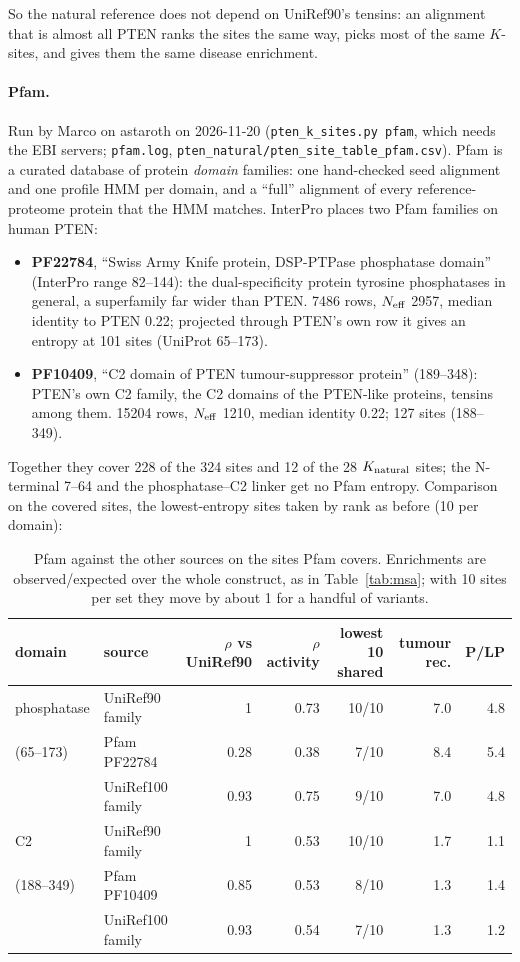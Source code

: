 \documentclass[11pt,a4paper]{article}
\newcommand{\file}[1]{\texttt{#1}}
\begin{document}
So the natural reference does not depend on UniRef90's tensins: an
alignment that is almost all PTEN ranks the sites the same way, picks most of
the same $K$-sites, and gives them the same disease enrichment.

\paragraph{Pfam.} Run by Marco on astaroth on 2026-11-20
(\texttt{pten\_k\_sites.py pfam}, which needs the EBI servers; \file{pfam.log},
\file{pten\_natural/pten\_site\_table\_pfam.csv}). Pfam is a curated database
of protein \emph{domain} families: one hand-checked seed alignment and one
profile HMM per domain, and a ``full'' alignment of every reference-proteome
protein that the HMM matches. InterPro places two Pfam families on human PTEN:
\begin{itemize}
\item \textbf{PF22784}, ``Swiss Army Knife protein, DSP-PTPase phosphatase
  domain'' (InterPro range 82--144): the dual-specificity protein tyrosine
  phosphatases in general, a superfamily far wider than PTEN. 7486 rows,
  $N_{\rm eff}$ 2957, median identity to PTEN 0.22; projected through PTEN's
  own row it gives an entropy at 101 sites (UniProt 65--173).
\item \textbf{PF10409}, ``C2 domain of PTEN tumour-suppressor protein''
  (189--348): PTEN's own C2 family, the C2 domains of the PTEN-like
  proteins, tensins among them. 15204 rows, $N_{\rm eff}$ 1210, median identity 0.22;
  127 sites (188--349).
\end{itemize}
Together they cover 228 of the 324 sites and 12 of the 28 $K_{\rm natural}$
sites; the N-terminal 7--64 and the phosphatase--C2 linker get no Pfam
entropy. Comparison on the covered sites, the lowest-entropy sites taken by
rank as before (10 per domain):

\begin{table}[H]\centering\small
\begin{tabular}{@{}llrrrrr@{}}
\toprule
domain & source & $\rho$ vs UniRef90 & $\rho$ activity & lowest 10 shared & tumour rec. & P/LP\\
\midrule
phosphatase & UniRef90 family & 1 & 0.73 & 10/10 & 7.0 & 4.8\\
(65--173) & Pfam PF22784 & 0.28 & 0.38 & 7/10 & 8.4 & 5.4\\
 & UniRef100 family & 0.93 & 0.75 & 9/10 & 7.0 & 4.8\\
\midrule
C2 & UniRef90 family & 1 & 0.53 & 10/10 & 1.7 & 1.1\\
(188--349) & Pfam PF10409 & 0.85 & 0.53 & 8/10 & 1.3 & 1.4\\
 & UniRef100 family & 0.93 & 0.54 & 7/10 & 1.3 & 1.2\\
\bottomrule
\end{tabular}
\caption{Pfam against the other sources on the sites Pfam covers. Enrichments
are observed/expected over the whole construct, as in Table~\ref{tab:msa};
with 10 sites per set they move by about 1 for a handful of variants.}
\label{tab:pfam}
\end{table}
\end{document}
